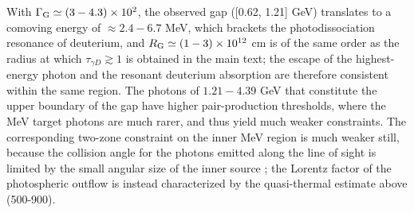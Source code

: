 \documentclass[prd,twocolumn,amsmath,amssymb,aps,linenumbers]{revtex4-2} %
\begin{document}
With $\Gamma_{\rm G}\simeq(3-4.3)\times10^{2}$, the observed gap ([0.62, 1.21] GeV) translates to a comoving energy of $\approx2.4-6.7$ MeV, which brackets the photodissociation resonance of deuterium, and $R_{\rm G}\simeq(1-3)\times10^{12}$ cm is of the same order as the radius at which $\tau_{\gamma D}\gtrsim1$ is obtained in the main text; the escape of the highest-energy photon and the resonant deuterium absorption are therefore consistent within the same region. The photons of $1.21-4.39$ GeV that constitute the upper boundary of the gap have higher pair-production thresholds, where the MeV target photons are much rarer, and thus yield much weaker constraints. The corresponding two-zone constraint on the inner MeV region is much weaker still, because the collision angle for the photons emitted along the line of sight is limited by the small angular size of the inner source \citep{2011ApJ...726L...2Z}; the Lorentz factor of the photospheric outflow is instead characterized by the quasi-thermal estimate above (500-900).

\end{document}
